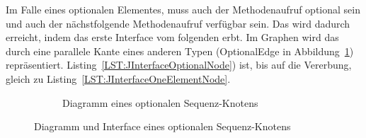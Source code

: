 \documentclass[../InterneDSLs.tex]{subfiles}
\begin{document}
Im Falle eines optionalen Elementes, muss auch der Methodenaufruf optional sein und auch der nächstfolgende Methodenaufruf verfügbar sein. Das wird dadurch erreicht, indem das erste Interface vom folgenden erbt. Im Graphen wird das durch eine parallele Kante eines anderen Typen (OptionalEdge in Abbildung~\ref{FIG:DiagramOptionalNode}) repräsentiert. Listing~\ref{LST:JInterfaceOptionalNode}) ist, bis auf die Vererbung, gleich zu Listing~\ref{LST:JInterfaceOneElementNode}.
\begin{figure}[ht]
\centering
  \begin{subfigure}[c]{0.49\textwidth}
    \caption{Diagramm eines optionalen Sequenz-Knotens}
    \label{FIG:DiagramOptionalNode}
  \end{subfigure}
  \begin{subfigure}[c]{0.49\textwidth}
    
  \end{subfigure}
  \caption{Diagramm und Interface eines optionalen Sequenz-Knotens}
  \label{FIG:OptionalNode}
\end{figure}
\end{document}
